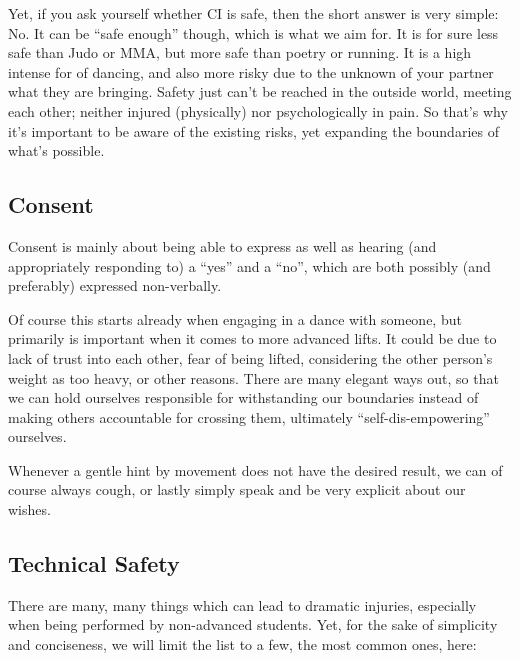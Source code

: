 Yet, if you ask yourself whether CI is safe, then the short answer is very simple: No.
It can be ``safe enough'' though, which is what we aim for.
It is for sure less safe than Judo or MMA, but more safe than poetry or running.
It is a high intense for of dancing, and also more risky due to the unknown of your partner what they are bringing.
Safety just can't be reached in the outside world, meeting each other;
neither injured (physically) nor psychologically in pain.
So that's why it's important to be aware of the existing risks, yet expanding the boundaries of what's possible.

\subsection{Consent}\label{subsec:consent}

Consent is mainly about being able to express as well as hearing (and appropriately responding to) a ``yes'' and a ``no'', which are both possibly (and preferably) expressed non-verbally.

Of course this starts already when engaging in a dance with someone, but primarily is important when it comes to more advanced lifts.
It could be due to lack of trust into each other, fear of being lifted, considering the other person's weight as too heavy, or other reasons.
There are many elegant ways out, so that we can hold ourselves responsible for withstanding our boundaries instead of making others accountable for crossing them, ultimately ``self-dis-empowering'' ourselves.

Whenever a gentle hint by movement does not have the desired result, we can of course always cough, or lastly simply speak and be very explicit about our wishes.

\subsection{Technical Safety}\label{subsec:technical-safety}

There are many, many things which can lead to dramatic injuries, especially when being performed by non-advanced students.
Yet, for the sake of simplicity and conciseness, we will limit the list to a few, the most common ones, here:

